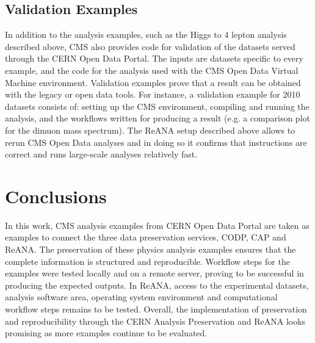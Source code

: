 \documentclass[letter]{article}
\newcommand\tab[1][1cm]{\hspace*{#1}}
\begin{document}
\subsection{Validation Examples}
\tab In addition to the analysis examples, such as the Higgs to 4 lepton analysis described above, CMS also provides code for validation of the datasets served through the CERN Open Data Portal. The inputs are datasets specific to every example, and the code for the analysis used with the CMS Open Data Virtual Machine environment.  Validation examples prove that a result can be obtained with the legacy or open data tools. For instance, a validation example for 2010 datasets consists of: setting up the CMS environment, compiling and running the analysis, and the workflows written for producing a result (e.g. a comparison plot for the dimuon mass spectrum). The ReANA setup described above allows to rerun CMS Open Data
analyses and in doing so it confirms that instructions are correct and runs large-scale analyses relatively fast.

\section{Conclusions}
\tab In this work, CMS analysis examples from CERN Open Data Portal are taken as examples to connect the three data preservation services, CODP, CAP and ReANA.
The preservation of these physics analysis examples ensures that the complete information is structured and reproducible. Workflow steps for the examples were tested locally and on a remote server, proving to be successful in producing the expected outputs. In ReANA, access to the experimental datasets, analysis software area, operating system environment and computational workflow steps remains to be tested. Overall, the implementation of preservation and reproducibility through the CERN Analysis Preservation and ReANA looks promising as more examples continue to be evaluated. 
\end{document}
